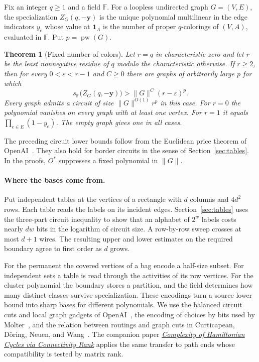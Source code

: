 \documentclass[11pt]{article}
\newtheorem{theorem}{Theorem}[section]
\theoremstyle{definition}
\newcommand{\F}{\mathbb F}
\newcommand{\pw}{\operatorname{pw}}
\newcommand{\OO}{O^*}
\begin{document}
Fix an integer \(q\ge1\) and a field \(\F\). For a loopless undirected graph \(G=(V,E)\), the specialization \(Z_G(q,-\mathbf y)\) is the unique polynomial multilinear in the edge indicators \(y_e\) whose value at \(\mathbf1_A\) is the number of proper \(q\)-colorings of \((V,A)\), evaluated in \(\F\). Put \(p=\pw(G)\).

\begin{theorem}[Fixed number of colors]\label{thm:color}
Let \(r=q\) in characteristic zero and let \(r\) be the least nonnegative residue of \(q\) modulo the characteristic otherwise. If \(r\ge2\), then for every \(0<\varepsilon<r-1\) and \(C\ge0\) there are graphs of arbitrarily large \(p\) for which
\[
                      s_{\F}\bigl(Z_G(q,-\mathbf y)\bigr)>\|G\|^C(r-\varepsilon)^p .
\]
Every graph admits a circuit of size \(\|G\|^{O(1)}r^p\) in this case. For \(r=0\) the polynomial vanishes on every graph with at least one vertex. For \(r=1\) it equals \(\prod_{e\in E}(1-y_e)\). The empty graph gives one in all cases.
\end{theorem}

The preceding circuit lower bounds follow from the Euclidean price theorem of OpenAI~\cite{euclid}. They also hold for border circuits in the sense of Section~\ref{sec:tables}. In the proofs, \(\OO\) suppresses a fixed polynomial in \(\|G\|\).

\paragraph{Where the bases come from.}
Put independent tables at the vertices of a rectangle with \(d\) columns and \(4d^2\) rows. Each table reads the labels on its incident edges. Section~\ref{sec:tables} uses the three-part circuit inequality to show that an alphabet of \(2^w\) labels costs nearly \(dw\) bits in the logarithm of circuit size. A row-by-row sweep crosses at most \(d+1\) wires. The resulting upper and lower estimates on the required boundary agree to first order as \(d\) grows.

For the permanent the covered vertices of a bag encode a half-size subset. For independent sets a table is read through the activities of its row vertices. For the cluster polynomial the boundary stores a partition, and the field determines how many distinct classes survive specialization. These encodings turn a source lower bound into sharp bases for different polynomials. We use the balanced circuit cuts and local graph gadgets of OpenAI~\cite{circuits}, the encoding of choices by bits used by Molter~\cite{molter}, and the relation between routings and graph cuts in Curticapean, Döring, Neuen, and Wang~\cite{linkup}. The companion paper \href{matching-connectivity-width.pdf}{\emph{Complexity of Hamiltonian Cycles via Connectivity Rank}} applies the same transfer to path ends whose compatibility is tested by matrix rank.
\end{document}

